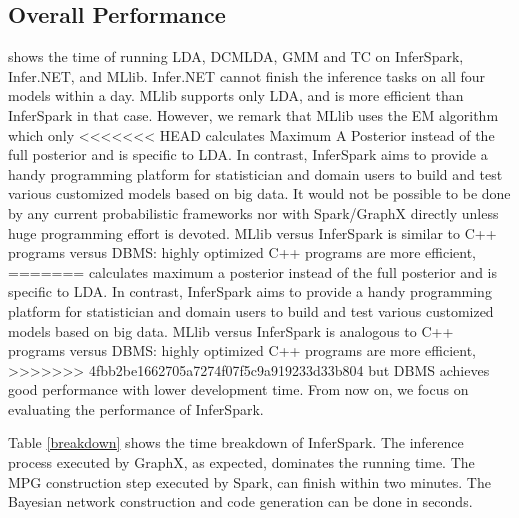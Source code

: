 \subsection{Overall Performance}
 shows the time of running LDA, DCMLDA, GMM and
TC on InferSpark, Infer.NET, and MLlib.
Infer.NET cannot finish the inference tasks on all four models within a day.
MLlib supports only LDA, and is more efficient than InferSpark in that case.
However, we remark that MLlib uses the EM algorithm which only
<<<<<<< HEAD
calculates Maximum A Posterior instead of the full posterior and is specific to LDA.
In contrast, InferSpark aims to provide a handy programming platform for statistician and domain users to build and test various customized models based on big data.
It would not be possible to be done by any current probabilistic frameworks nor with Spark/GraphX directly unless huge programming effort is devoted.
MLlib versus InferSpark
is similar to C++ programs versus DBMS: highly optimized C++ programs are more efficient,
=======
calculates maximum a posterior instead of the full posterior and 
is specific to LDA.
In contrast, InferSpark aims to provide a handy programming platform 
for statistician and domain users to build and test various customized 
models based on big data.
MLlib versus InferSpark is analogous to C++ programs versus DBMS: 
highly optimized C++ programs are more efficient, 
>>>>>>> 4fbb2be1662705a7274f07f5c9a919233d33b804
but DBMS achieves good performance with lower development time.
From now on, we focus on evaluating the performance of InferSpark.

Table \ref{breakdown} shows the time breakdown of InferSpark.
The inference process executed by GraphX, as expected,
dominates the running time.
The MPG construction step executed by Spark, can finish within two minutes.
The Bayesian network construction and code generation can be done in seconds.

